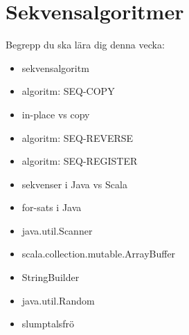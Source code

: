 \chapter{Sekvensalgoritmer}\label{chapter:W05}
Begrepp du ska lära dig denna vecka:
\begin{multicols}{2}\begin{itemize}[nosep,label={$\square$},leftmargin=*]
\item sekvensalgoritm
\item algoritm: SEQ-COPY
\item in-place vs copy
\item algoritm: SEQ-REVERSE
\item algoritm: SEQ-REGISTER
\item sekvenser i Java vs Scala
\item for-sats i Java
\item java.util.Scanner
\item scala.collection.mutable.ArrayBuffer
\item StringBuilder
\item java.util.Random
\item slumptalsfrö\end{itemize}\end{multicols}
